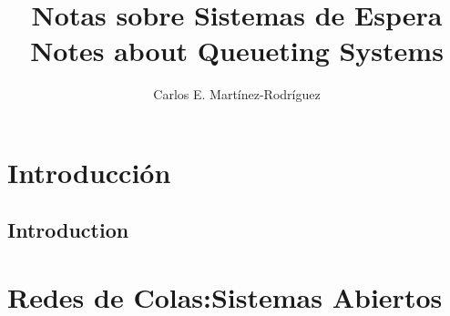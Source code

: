 \documentclass{article}
\title{Notas sobre Sistemas de Espera\\
\small{Notes about Queueting Systems}}
\author{Carlos E. Martínez-Rodríguez}
\date{}
\renewcommand{\abstractname}{Resumen}
\numberwithin{equation}{section}
\begin{document}
\maketitle

\begin{abstract}

\end{abstract}

\begin{otherlanguage}{english}
\renewcommand{\abstractname}{Abstract} %
\begin{abstract}

\end{abstract}
\end{otherlanguage}

\tableofcontents

\section*{Introducción}



\begin{otherlanguage}{english}
\renewcommand{\abstractname}{Abstract} %
\section*{Introduction}


\end{otherlanguage}




%
\section{Redes de Colas:Sistemas Abiertos}
\end{document}

